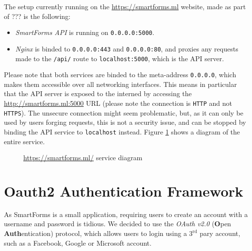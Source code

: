 \documentclass[11pt, a4paper]{report}
\def\code#1{\texttt{#1}}
\begin{document}
The setup currently running on the \url{https://smartforms.ml} website, made as part of ???\cite{felix} is the following:
\begin{itemize}
	\item \textit{SmartForms API} is running on \code{0.0.0.0:5000}.
	\item \textit{Nginx} is binded to \code{0.0.0.0:443} and \code{0.0.0.0:80}, and proxies any requests made to the \code{/api/} route to \code{localhost:5000}, which is the API server. 
\end{itemize}

Please note that both services are binded to the meta-address \code{0.0.0.0}, which makes them accessible over all networking interfaces. This means in particular that the API server is exposed to the interned by accessing the \url{http://smartforms.ml:5000} URL (please note the connection is \code{HTTP} and not \code{HTTPS}). The unsecure connection might seem problematic, but, as it can only be used by users forging requests, this is not a security issue, and can be stopped by binding the API service to \code{localhost} instead. Figure \ref{smartformsml-diagram} shows a diagram of the entire service.


\begin{figure}[!h]
	\centering
	\caption{\url{https://smartforms.ml/} service diagram}
	\label{smartformsml-diagram}
\end{figure}


\section{Oauth2 Authentication Framework}

As SmartForms is a small application, requiring users to create an account with a username and password is tidious. We decided to use the \textit{OAuth v2.0}\cite{oauth2} (\textbf{O}pen \textbf{Auth}entication) protocol, which allows users to login using a $3^\textrm{rd}$ pary account, such as a Facebook, Google or Microsoft account.
\end{document}
